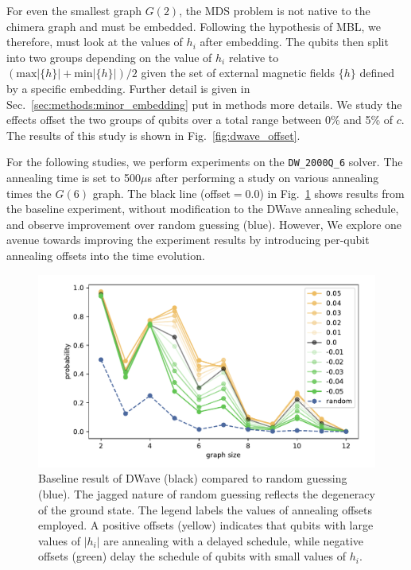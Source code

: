 \documentclass[prd,twocolumn,tightenlines,preprintnumbers,showpacs,superscriptaddress,notitlepage,nofootinbib,eqsecnum,floatfix,longbibliography,aps,10pt]{revtex4-2}
\begin{document}
For even the smallest graph $G(2)$, the MDS problem is not native to the chimera graph and must be embedded. Following the hypothesis of MBL, we therefore, must look at the values of $h_i$ after embedding. The qubits then split into two groups depending on the value of $h_i$ relative to $(\textrm{max}|\{h\}| + \textrm{min}|\{h\}|) / 2$ given the set of external magnetic fields $\{h\}$ defined by a specific embedding. Further detail is given in Sec.~\ref{sec:methods:minor_embedding} {\color{red} put in methods more details}. We study the effects offset the two groups of qubits over a total range between 0\% and 5\% of $c$. The results of this study is shown in Fig.~\ref{fig:dwave_offset}.

For the following studies, we perform experiments on the \texttt{DW\_2000Q\_6} solver. The annealing time is set to 500$\mu$s after performing a study on various annealing times the $G(6)$ graph. The black line (offset$=0.0$) in Fig.~\ref{fig:baseline} shows results from the baseline experiment, without modification to the DWave annealing schedule, and observe improvement over random guessing (blue). However, We explore one avenue towards improving the experiment results by introducing per-qubit annealing offsets into the time evolution.

\begin{figure}
	\centering
	\includegraphics[width=\columnwidth]{./new_figures/DWave_scaling.pdf}
	\caption{Baseline result of DWave (black) compared to random guessing (blue). The jagged nature of random guessing reflects the degeneracy of the ground state. The legend labels the values of annealing offsets employed. A positive offsets (yellow) indicates that qubits with large values of $|h_i|$ are annealing with a delayed schedule, while negative offsets (green) delay the schedule of qubits with small values of $h_i$.}
	\label{fig:baseline}
\end{figure}
\end{document}
